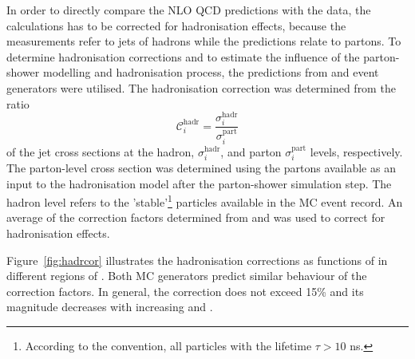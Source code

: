 In order to directly compare the NLO QCD predictions with the data, the calculations has to be corrected for hadronisation effects, because the measurements refer to jets of hadrons while the predictions relate to partons. To determine hadronisation corrections and to estimate the influence of the parton-shower modelling and hadronisation process, the predictions from \ariadne and \lepto event generators were utilised. The hadronisation correction was determined from the ratio 
\begin{equation}
 \mathcal{C}^\text{hadr}_i = \frac{\sigma_i^\text{hadr}}{\sigma_i^\text{part}}
 \label{eq:hadrcor}
\end{equation}
of the jet cross sections at the hadron, $\sigma_i^\text{hadr}$, and parton $\sigma_i^\text{part}$ levels, respectively. The parton-level cross section was determined using the partons available as an input to the hadronisation model after the parton-shower simulation step. The hadron level refers to the 'stable'\footnote{According to the \zeus convention, all particles with the lifetime $\tau > 10$ ns.} particles available in the MC event record. An average of the correction factors determined from \ariadne and \lepto was used to correct for hadronisation effects.

Figure~\ref{fig:hadrcor} illustrates the hadronisation corrections as functions of \etjetb in different regions of \qsq. Both MC generators predict similar behaviour of the correction factors. In general, the correction does not exceed 15\% and its magnitude decreases with increasing \etjetb and \qsq.



